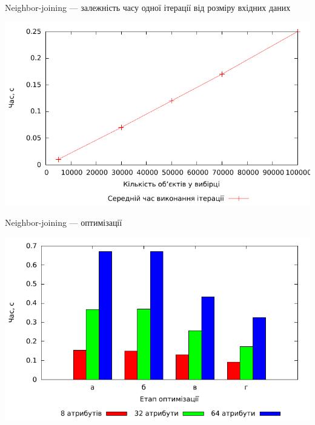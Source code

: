 \documentclass{beamer}
\begin{document}
    \begin{frame}{Neighbor-joining --- залежність часу одної ітерації від розміру вхідних даних}
        \begin{center}
            \includegraphics[scale=0.8]{nj_complexity.pdf}
        \end{center}
    \end{frame}
    
        
    \begin{frame}{Neighbor-joining --- оптимізації}
        \begin{center}
            \includegraphics[scale=0.8]{nj_compare.pdf}
        \end{center}
    \end{frame}
    
\end{document}
